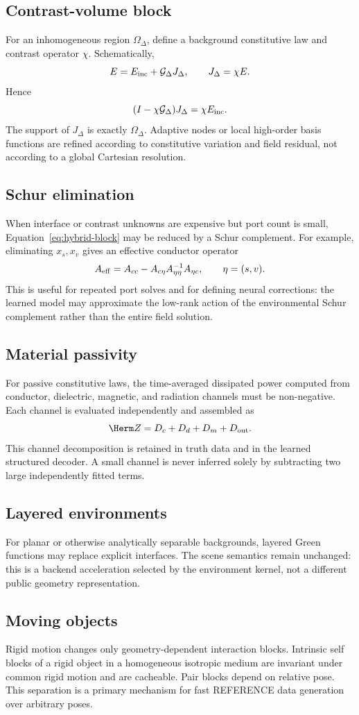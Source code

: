 \subsection{Contrast-volume block}

For an inhomogeneous region $\Omega_\Delta$, define a background constitutive
law and contrast operator $\chi$. Schematically,
\[
  E=E_{\rm inc}+\mathcal G_\Delta J_\Delta,\qquad
  J_\Delta=\chi E .
\]
Hence
\[
  (I-\chi\mathcal G_\Delta)J_\Delta
  =
  \chi E_{\rm inc}.
\]
The support of $J_\Delta$ is exactly $\Omega_\Delta$. Adaptive nodes or local
high-order basis functions are refined according to constitutive variation and
field residual, not according to a global Cartesian resolution.

\subsection{Schur elimination}

When interface or contrast unknowns are expensive but port count is small,
Equation~\eqref{eq:hybrid-block} may be reduced by a Schur complement. For
example, eliminating $x_s,x_v$ gives an effective conductor operator
\[
 A_{\rm eff}
 =
 A_{cc}
 -A_{c\eta}A_{\eta\eta}^{-1}A_{\eta c},
 \qquad
 \eta=(s,v).
\]
This is useful for repeated port solves and for defining neural corrections:
the learned model may approximate the low-rank action of the environmental
Schur complement rather than the entire field solution.

\subsection{Material passivity}

For passive constitutive laws, the time-averaged dissipated power computed from
conductor, dielectric, magnetic, and radiation channels must be non-negative.
Each channel is evaluated independently and assembled as
\[
 \Herm Z
 =
 D_c+D_d+D_m+D_{\rm out}.
\]
This channel decomposition is retained in truth data and in the learned
structured decoder. A small channel is never inferred solely by subtracting two
large independently fitted terms.

\subsection{Layered environments}

For planar or otherwise analytically separable backgrounds, layered Green
functions may replace explicit interfaces. The scene semantics remain
unchanged: this is a backend acceleration selected by the environment kernel,
not a different public geometry representation.

\subsection{Moving objects}

Rigid motion changes only geometry-dependent interaction blocks. Intrinsic self
blocks of a rigid object in a homogeneous isotropic medium are invariant under
common rigid motion and are cacheable. Pair blocks depend on relative pose.
This separation is a primary mechanism for fast REFERENCE data generation over
arbitrary poses.
